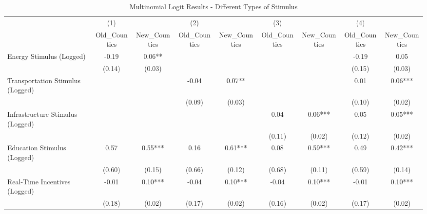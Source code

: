 \begin{table}[!htbp]\centering
\def\sym#1{\ifmmode^{#1}\else\(^{#1}\)\fi}
\caption{Multinomial Logit Results - Different Types of Stimulus}
\begin{tabular}{l*{8}{c}}
\hline\hline
                    &         (1)   &               &         (2)   &               &         (3)   &               &         (4)   &               \\
                    &Old_Counties   &New_Counties   &Old_Counties   &New_Counties   &Old_Counties   &New_Counties   &Old_Counties   &New_Counties   \\
\hline
Energy Stimulus (Logged)&       -0.19   &        0.06** &               &               &               &               &       -0.19   &        0.05   \\
                    &      (0.14)   &      (0.03)   &               &               &               &               &      (0.15)   &      (0.03)   \\
Transportation Stimulus (Logged)&               &               &       -0.04   &        0.07** &               &               &        0.01   &        0.06***\\
                    &               &               &      (0.09)   &      (0.03)   &               &               &      (0.10)   &      (0.02)   \\
Infrastructure Stimulus (Logged)&               &               &               &               &        0.04   &        0.06***&        0.05   &        0.05***\\
                    &               &               &               &               &      (0.11)   &      (0.02)   &      (0.12)   &      (0.02)   \\
Education Stimulus (Logged)&        0.57   &        0.55***&        0.16   &        0.61***&        0.08   &        0.59***&        0.49   &        0.42***\\
                    &      (0.60)   &      (0.15)   &      (0.66)   &      (0.12)   &      (0.68)   &      (0.11)   &      (0.59)   &      (0.14)   \\
Real-Time Incentives (Logged)&       -0.01   &        0.10***&       -0.04   &        0.10***&       -0.04   &        0.10***&       -0.01   &        0.10***\\
                    &      (0.18)   &      (0.02)   &      (0.17)   &      (0.02)   &      (0.16)   &      (0.02)   &      (0.17)   &      (0.02)   \\

\end{tabular}
\end{table}
